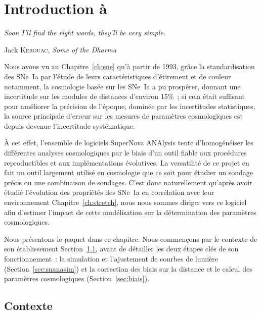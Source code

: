\documentclass[../main/main.tex]{subfiles}
\begin{document}

\chapter{Introduction \`a \snana}\label{ch:snana}
\epigraph{\openquote\textit{Soon I'll find the right words, they'll be very
simple.}\closequote}{Jack \textsc{Kerouac}, \textit{Some of the Dharma}}

Nous avons vu au Chapitre~\ref{ch:sne} qu'à partir de 1993, grâce la
standardisation des SNe~Ia par l'étude de leurs caractéristiques d'étirement et
de couleur notamment, la cosmologie basée sur les SNe~Ia a pu prospérer, donnant
une incertitude sur les modules de distances d'environ 15\%~; si cela était
suffisant pour améliorer la précision de l'époque, dominée par les incertitudes
statistiques, la source principale d'erreur sur les mesures de paramètres
cosmologiques est depuis devenue l'incertitude systématique.

À cet effet, l'ensemble de logiciels SuperNova ANAlysis
\citep[\snana,][]{kessler2009a} tente d'homogénéiser les différentes analyses
cosmologiques par le biais d'un outil fiable aux procédures reproductibles et
aux implémentations évolutives. La versatilité de ce projet en fait un outil
largement utilisé en cosmologie \citep[par exemple,][]{kessler2009b, conley2011,
betoule2014, smith2020} que ce soit pour étudier un sondage précis ou une
combinaison de sondages. C'est donc naturellement qu'après avoir étudié
l'évolution des propriétés des SNe~Ia en corrélation avec leur environnement
Chapitre~\ref{ch:stretch}, nous nous sommes dirigæ vers ce logiciel afin
d'estimer l'impact de cette modélisation sur la détermination des paramètres
cosmologiques.

Nous présentons le paquet dans ce chapitre. Nous commençons par le contexte de
son établissement Section~\ref{sec:snanacont}, avant de détailler les deux
étapes clés de son fonctionnement~: la simulation et l'ajustement de courbes de
lumière (Section~\ref{sec:snanasim}) et la correction des biais sur la distance
et le calcul des paramètres cosmologiques (Section~\ref{sec:biais}).

\vfill
\minitoc
\vfill

\newpage

\section{Contexte}\label{sec:snanacont}
\end{document}
